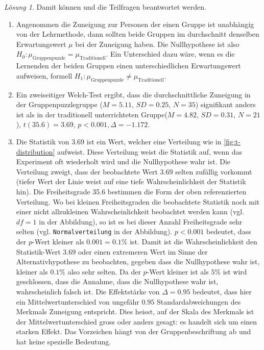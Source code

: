 \documentclass[
]{book}
\providecommand{\tightlist}{%
  \setlength{\itemsep}{0pt}\setlength{\parskip}{0pt}}
\theoremstyle{definition}
\theoremstyle{definition}
\theoremstyle{definition}
\theoremstyle{definition}
\theoremstyle{remark}
\newtheorem*{solution}{Lösung}
\begin{document}
\begin{solution}
Damit können und die Teilfragen beantwortet werden.

\begin{enumerate}
\def\labelenumi{\alph{enumi})}
\tightlist
\item
  Angenommen die Zuneigung zur Personen der einen Gruppe ist unabhängig von der Lehrmethode, dann sollten beide Gruppen im durchschnitt denselben Erwartungswert \(\mu\) bei der Zuneigung haben. Die Nullhypothese ist also \(H_0: \mu_\text{Gruppenpuzzle} = \mu_\text{Traditionell}\). Ein Unterschied dazu wäre, wenn es die Lernenden der beiden Gruppen einen unterschiedlichen Erwartungswert aufweisen, formell \(H_1: \mu_\text{Gruppenpuzzle} \neq \mu_\text{Traditionell}\).
\item
  Ein zweiseitiger Welch-Test ergibt, dass die durchschnittliche Zuneigung in der Gruppenpuzzlegruppe (\(M = 5.11\), \(SD = 0.25\), \(N = 35\)) signifikant anders ist als in der traditionell unterrichteten Gruppe(\(M = 4.82\), \(SD = 0.31\), \(N = 21\)), \(t(35.6) = 3.69\), \(p < 0.001, \Delta = -1.172\).
\item
  Die Statistik von \(3.69\) ist ein Wert, welcher eine Verteilung wie in \ref{fig:t-distribution} aufweist. Diese Verteilung weist die Statistik auf, wenn das Experiment oft wiederholt wird und die Nullhypothese wahr ist. Die Verteilung zweigt, dass der beobachtete Wert \(3.69\) selten zufällig vorkommt (tiefer Wert der Linie weist auf eine tiefe Wahrscheinlichkeit der Statistik hin). Die Freiheitsgrade 35.6 bestimmen die Form der oben referenzierten Verteilung. Wo bei kleinen Freiheitsgraden die beobachtete Statistik noch mit einer nicht allzukleinen Wahrscheinlichkeit beobachtet werden kann (vgl. \(df = 1\) in der Abbildung), so ist es bei dieser Anzahl Freiheitsgrade sehr selten (vgl. \texttt{Normalverteilung} in der Abbildung). \(p < 0.001\) bedeutet, dass der \(p\)-Wert kleiner als \(0.001 = 0.1\%\) ist. Damit ist die Wahrscheinlichkeit den Statistik-Wert \(3.69\) oder einen extremeren Wert im Sinne der Alternativhypothese zu beobachten, gegeben dass die Nullhypothese wahr ist, kleiner als \(0.1\%\) also sehr selten. Da der \(p\)-Wert kleiner ist als \(5\%\) ist wird geschlossen, dass die Annahme, dass die Nullhypothese wahr ist, wahrscheinlich falsch ist. Die Effektstärke von \(\Delta = 0.95\) bedeutet, dass hier ein Mittelwertunterschied von ungefähr \(0.95\) Standardabweichungen des Merkmals Zuneigung entspricht. Dies heisst, auf der Skala des Merkmals ist der Mittelwertunterschied gross oder anders gesagt: es handelt sich um einen starken Effekt. Das Vorzeichen hängt von der Gruppenbeschriftung ab und hat keine spezielle Bedeutung.
\end{enumerate}

\end{solution}
\end{document}
